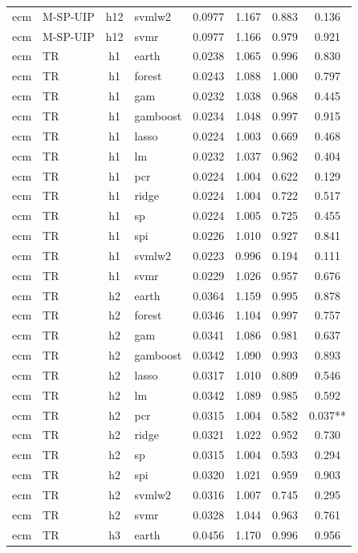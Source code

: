 \begin{ThreePartTable}
\begin{longtable}[t]{llclcccc}
ecm & M-SP-UIP & h12 & svmlw2 & 0.0977 & 1.167 & 0.883 & 0.136\\
ecm & M-SP-UIP & h12 & svmr & 0.0977 & 1.166 & 0.979 & 0.921\\
\addlinespace
ecm & TR & h1 & earth & 0.0238 & 1.065 & 0.996 & 0.830\\
ecm & TR & h1 & forest & 0.0243 & 1.088 & 1.000 & 0.797\\
ecm & TR & h1 & gam & 0.0232 & 1.038 & 0.968 & 0.445\\
ecm & TR & h1 & gamboost & 0.0234 & 1.048 & 0.997 & 0.915\\
ecm & TR & h1 & lasso & 0.0224 & 1.003 & 0.669 & 0.468\\
ecm & TR & h1 & lm & 0.0232 & 1.037 & 0.962 & 0.404\\
ecm & TR & h1 & pcr & 0.0224 & 1.004 & 0.622 & 0.129\\
ecm & TR & h1 & ridge & 0.0224 & 1.004 & 0.722 & 0.517\\
ecm & TR & h1 & sp & 0.0224 & 1.005 & 0.725 & 0.455\\
ecm & TR & h1 & spi & 0.0226 & 1.010 & 0.927 & 0.841\\
ecm & TR & h1 & svmlw2 & 0.0223 & 0.996 & 0.194 & 0.111\\
ecm & TR & h1 & svmr & 0.0229 & 1.026 & 0.957 & 0.676\\
\addlinespace
ecm & TR & h2 & earth & 0.0364 & 1.159 & 0.995 & 0.878\\
ecm & TR & h2 & forest & 0.0346 & 1.104 & 0.997 & 0.757\\
ecm & TR & h2 & gam & 0.0341 & 1.086 & 0.981 & 0.637\\
ecm & TR & h2 & gamboost & 0.0342 & 1.090 & 0.993 & 0.893\\
ecm & TR & h2 & lasso & 0.0317 & 1.010 & 0.809 & 0.546\\
ecm & TR & h2 & lm & 0.0342 & 1.089 & 0.985 & 0.592\\
ecm & TR & h2 & pcr & 0.0315 & 1.004 & 0.582 & 0.037**\\
ecm & TR & h2 & ridge & 0.0321 & 1.022 & 0.952 & 0.730\\
ecm & TR & h2 & sp & 0.0315 & 1.004 & 0.593 & 0.294\\
ecm & TR & h2 & spi & 0.0320 & 1.021 & 0.959 & 0.903\\
ecm & TR & h2 & svmlw2 & 0.0316 & 1.007 & 0.745 & 0.295\\
ecm & TR & h2 & svmr & 0.0328 & 1.044 & 0.963 & 0.761\\
\addlinespace
ecm & TR & h3 & earth & 0.0456 & 1.170 & 0.996 & 0.956\\

\end{longtable}
\end{ThreePartTable}
